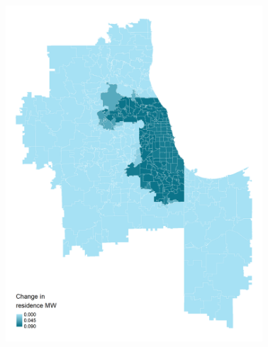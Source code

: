 \documentclass[aspectratio=169, t]{beamer}
\begin{document}
\begin{frame}[label = chi_example]
    
    \vspace{-5mm}
    \begin{columns}
        \begin{column}{0.50\textwidth}
            \vspace{-4mm}
            \begin{figure}
                \centering
                \includegraphics[scale = 0.395]{maps_events/output/chicago_2019-6_statutory_mw.png}
            \end{figure}   
        \end{column}
        \begin{column}{0.50\textwidth}
            \vspace{-4mm}
            \begin{figure}
                \centering

\end{figure}
\end{column}
\end{columns}
\end{frame}
\end{document}
